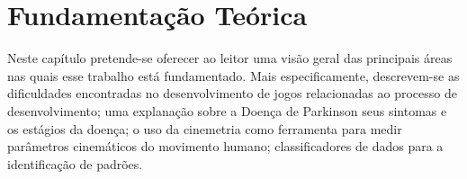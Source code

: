 \chapter{Fundamentação Teórica}\label{chapter:fundamentacao}
Neste capítulo pretende-se oferecer ao leitor uma visão geral das principais áreas nas quais esse trabalho está fundamentado. Mais especificamente, descrevem-se as dificuldades encontradas no desenvolvimento de jogos relacionadas ao processo de desenvolvimento; uma explanação sobre a Doença de Parkinson seus sintomas e os estágios da doença; o uso da cinemetria como ferramenta para medir parâmetros cinemáticos do movimento humano; classificadores de dados para a identificação de padrões.






